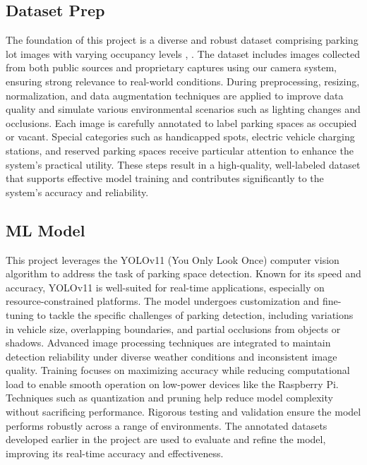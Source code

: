 \documentclass[conference]{IEEEtran}
\begin{document}
\subsection{Dataset Prep}

The foundation of this project is a diverse and robust dataset comprising parking lot images with varying occupancy levels \cite{dataset_images}, 
\cite{images_original}. 
The dataset includes images collected from both public sources and proprietary captures using our camera system, 
ensuring strong relevance to real-world conditions. 
During preprocessing, 
resizing, 
normalization, 
and data augmentation techniques are applied to improve data quality and simulate various environmental scenarios such as lighting changes and occlusions. 
Each image is carefully annotated to label parking spaces as occupied or vacant. 
Special categories such as handicapped spots, 
electric vehicle charging stations,
and reserved parking spaces receive particular attention to enhance the system’s practical utility. 
These steps result in a high-quality, 
well-labeled dataset that supports effective model training and contributes significantly to the system’s accuracy and reliability.

\subsection{ML Model}



This project leverages the YOLOv11 (You Only Look Once) 
computer vision algorithm \cite{yolo11_ultralytics} 
to address the task of parking space detection. 
Known for its speed and accuracy, 
YOLOv11 is well-suited for real-time applications, 
especially on resource-constrained platforms. 
The model undergoes customization and fine-tuning to tackle the specific challenges of parking detection, 
including variations in vehicle size, 
overlapping boundaries, 
and partial occlusions from objects or shadows. 
Advanced image processing techniques are integrated to maintain detection reliability under diverse weather conditions and inconsistent image quality. 
Training focuses on maximizing accuracy while reducing computational load to enable smooth operation on low-power devices like the Raspberry Pi. 
Techniques such as quantization and pruning help reduce model complexity without sacrificing performance. 
Rigorous testing and validation ensure the model performs robustly across a range of environments. 
The annotated datasets developed earlier in the project are used to evaluate and refine the model, 
improving its real-time accuracy and effectiveness.
\end{document}
